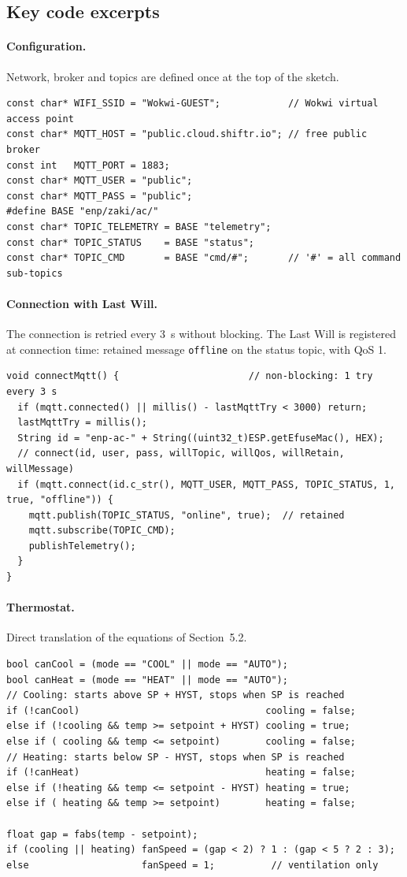\documentclass[11pt,a4paper]{article}
\begin{document}
\subsection{Key code excerpts}

\paragraph{Configuration.} Network, broker and topics are defined once at the top of the sketch.
\begin{lstlisting}[style=cpp]
const char* WIFI_SSID = "Wokwi-GUEST";            // Wokwi virtual access point
const char* MQTT_HOST = "public.cloud.shiftr.io"; // free public broker
const int   MQTT_PORT = 1883;
const char* MQTT_USER = "public";
const char* MQTT_PASS = "public";
#define BASE "enp/zaki/ac/"
const char* TOPIC_TELEMETRY = BASE "telemetry";
const char* TOPIC_STATUS    = BASE "status";
const char* TOPIC_CMD       = BASE "cmd/#";       // '#' = all command sub-topics
\end{lstlisting}

\paragraph{Connection with Last Will.} The connection is retried every \SI{3}{s} without
blocking. The Last Will is registered at connection time: retained message \texttt{offline} on
the status topic, with QoS 1.
\begin{lstlisting}[style=cpp]
void connectMqtt() {                       // non-blocking: 1 try every 3 s
  if (mqtt.connected() || millis() - lastMqttTry < 3000) return;
  lastMqttTry = millis();
  String id = "enp-ac-" + String((uint32_t)ESP.getEfuseMac(), HEX);
  // connect(id, user, pass, willTopic, willQos, willRetain, willMessage)
  if (mqtt.connect(id.c_str(), MQTT_USER, MQTT_PASS, TOPIC_STATUS, 1, true, "offline")) {
    mqtt.publish(TOPIC_STATUS, "online", true);  // retained
    mqtt.subscribe(TOPIC_CMD);
    publishTelemetry();
  }
}
\end{lstlisting}

\paragraph{Thermostat.} Direct translation of the equations of Section~5.2.
\begin{lstlisting}[style=cpp]
bool canCool = (mode == "COOL" || mode == "AUTO");
bool canHeat = (mode == "HEAT" || mode == "AUTO");
// Cooling: starts above SP + HYST, stops when SP is reached
if (!canCool)                                 cooling = false;
else if (!cooling && temp >= setpoint + HYST) cooling = true;
else if ( cooling && temp <= setpoint)        cooling = false;
// Heating: starts below SP - HYST, stops when SP is reached
if (!canHeat)                                 heating = false;
else if (!heating && temp <= setpoint - HYST) heating = true;
else if ( heating && temp >= setpoint)        heating = false;

float gap = fabs(temp - setpoint);
if (cooling || heating) fanSpeed = (gap < 2) ? 1 : (gap < 5 ? 2 : 3);
else                    fanSpeed = 1;          // ventilation only
\end{lstlisting}
\end{document}
